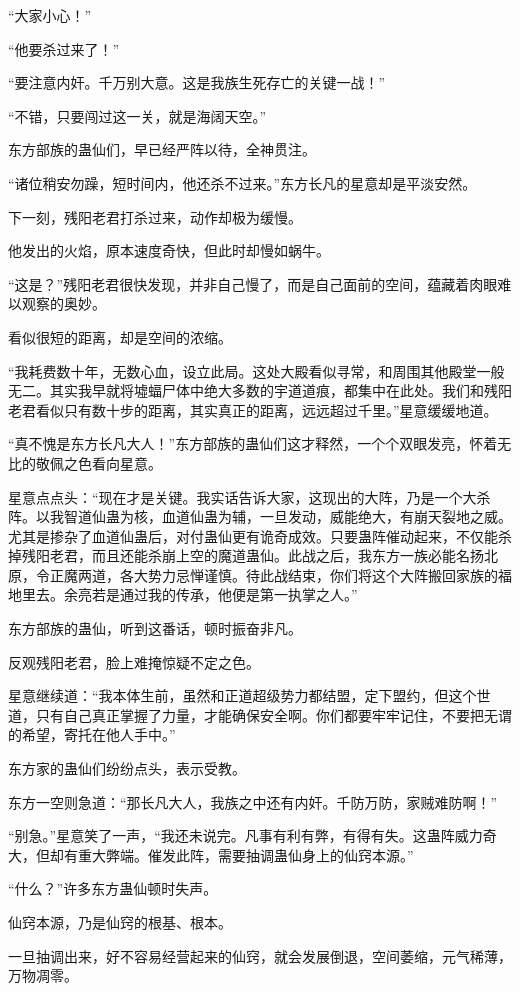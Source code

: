 \begin{this_body}
“大家小心！”

“他要杀过来了！”

“要注意内奸。千万别大意。这是我族生死存亡的关键一战！”

“不错，只要闯过这一关，就是海阔天空。”

东方部族的蛊仙们，早已经严阵以待，全神贯注。

“诸位稍安勿躁，短时间内，他还杀不过来。”东方长凡的星意却是平淡安然。

下一刻，残阳老君打杀过来，动作却极为缓慢。

他发出的火焰，原本速度奇快，但此时却慢如蜗牛。

“这是？”残阳老君很快发现，并非自己慢了，而是自己面前的空间，蕴藏着肉眼难以观察的奥妙。

看似很短的距离，却是空间的浓缩。

“我耗费数十年，无数心血，设立此局。这处大殿看似寻常，和周围其他殿堂一般无二。其实我早就将墟蝠尸体中绝大多数的宇道道痕，都集中在此处。我们和残阳老君看似只有数十步的距离，其实真正的距离，远远超过千里。”星意缓缓地道。

“真不愧是东方长凡大人！”东方部族的蛊仙们这才释然，一个个双眼发亮，怀着无比的敬佩之色看向星意。

星意点点头：“现在才是关键。我实话告诉大家，这现出的大阵，乃是一个大杀阵。以我智道仙蛊为核，血道仙蛊为辅，一旦发动，威能绝大，有崩天裂地之威。尤其是掺杂了血道仙蛊后，对付蛊仙更有诡奇成效。只要蛊阵催动起来，不仅能杀掉残阳老君，而且还能杀崩上空的魔道蛊仙。此战之后，我东方一族必能名扬北原，令正魔两道，各大势力忌惮谨慎。待此战结束，你们将这个大阵搬回家族的福地里去。余亮若是通过我的传承，他便是第一执掌之人。”

东方部族的蛊仙，听到这番话，顿时振奋非凡。

反观残阳老君，脸上难掩惊疑不定之色。

星意继续道：“我本体生前，虽然和正道超级势力都结盟，定下盟约，但这个世道，只有自己真正掌握了力量，才能确保安全啊。你们都要牢牢记住，不要把无谓的希望，寄托在他人手中。”

东方家的蛊仙们纷纷点头，表示受教。

东方一空则急道：“那长凡大人，我族之中还有内奸。千防万防，家贼难防啊！”

“别急。”星意笑了一声，“我还未说完。凡事有利有弊，有得有失。这蛊阵威力奇大，但却有重大弊端。催发此阵，需要抽调蛊仙身上的仙窍本源。”

“什么？”许多东方蛊仙顿时失声。

仙窍本源，乃是仙窍的根基、根本。

一旦抽调出来，好不容易经营起来的仙窍，就会发展倒退，空间萎缩，元气稀薄，万物凋零。


\end{this_body}
